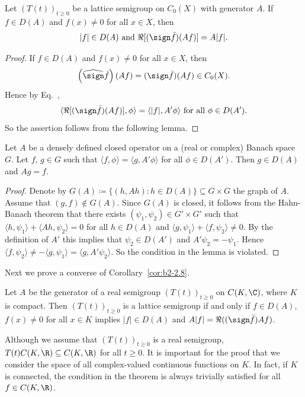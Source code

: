 \begin{corollary}\label{cor:b2-2.8}
Let $(T(t))_{t \geq 0}$ be a lattice semigroup on $C_{0}(X)$ with generator $A$.
If\/ $f \in D(A)$ and $f(x) \neq 0$ for all $x \in X$, then 
\[
|f| \in D(A) \text{ and } \Re[(\sign \bar{f})(Af)] = A|f| .
\]
\end{corollary}
\begin{proof}
If\/ $f \in D(A)$ and $f(x) \neq 0$ for all $x \in X$, then \[
\left(\widehat{\sign} \bar{f}\right)(Af) = (\sign \bar{f})(Af) \in C_{0}(X).
\]
Hence by Eq.~, 
\[
\langle \Re[(\sign \bar{f})(Af)],\phi \rangle = \langle |f|,A'\phi \rangle \text{ for all } \phi \in D(A').
\]
So the assertion follows from the following lemma.
\end{proof}
\begin{lemma}\label{lem:b2-2.9}
Let $A$ be a densely defined closed operator on a (real or complex) Banach space $G$.
Let $f$, $g \in G$ such that $\langle f,\phi \rangle = \langle g,A'\phi \rangle$ for all $\phi \in D(A')$.
Then $g \in D(A)$ and $Ag = f$.
\end{lemma}
\begin{proof}
Denote by $G(A) \coloneq \{(h,Ah) \colon h \in D(A)\} \subseteq G \times G$ the graph of\/ $A$.
Assume that $(g,f) \notin G(A)$.
Since $G(A)$ is closed, it follows from the Hahn-Banach theorem that there exists $(\psi_{1},\psi_{2}) \in G' \times G'$ such that $\langle h,\psi_{1} \rangle + \langle Ah,\psi_{2} \rangle = 0$ for all $h \in D(A)$ and $\langle g,\psi_{1} \rangle + \langle f,\psi_{2} \rangle \neq 0$.
By the definition of\/ $A'$ this implies that $\psi_{2} \in D(A')$ and $A'\psi_{2} = -\psi_{1}$.
Hence $\langle f,\psi_{2} \rangle \neq -\langle g,\psi_{1} \rangle = \langle g,A'\psi_{2} \rangle$.
So the condition in the lemma is violated.
\end{proof}
Next we prove a converse of Corollary~\ref{cor:b2-2.8}.
\begin{theorem}\label{thm:b2-2.10}
Let $A$ be the generator of a real semigroup $(T(t))_{t \geq 0}$ on $C(K,\C)$, where $K$ is compact.
Then $(T(t))_{t \geq 0}$ is a lattice semigroup if and only if\/ $f \in D(A)$, $f(x) \neq 0$ for all $x \in K$ implies $|f| \in D(A)$ and $A|f| = \Re((\sign \bar{f})Af)$.
\end{theorem}
\begin{remark*}\label{rem:b2-2.10-KGK}
Although we assume that $(T(t))_{t \geq 0}$ is a real semigroup, \ie $T(t)C(K,\R) \subseteq C(K,\R)$ for all $t \geq 0$.
It is important for the proof that we consider the space of all complex-valued continuous functions on $K$.
In fact, if\/ $K$ is connected, the condition in the theorem is always trivially satisfied for all $f \in C(K,\R)$.
\end{remark*}
